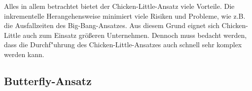\lb
Alles in allem betrachtet bietet der Chicken-Little-Ansatz viele Vorteile. Die inkrementelle Herangehensweise minimiert viele Risiken und Probleme, wie z.B. die Ausfallzeiten des Big-Bang-Ansatzes. Aus diesem Grund eignet sich Chicken-Little auch zum Einsatz größeren Unternehmen. Dennoch muss bedacht werden, dass die Durchf"uhrung des Chicken-Little-Ansatzes auch schnell sehr komplex werden kann.

\subsection{Butterfly-Ansatz}


